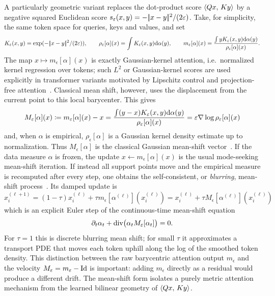 A particularly geometric variant replaces the dot-product score \(\langle Qx,\,Ky\rangle\) by a negative squared Euclidean score \(s_\varepsilon(x,y)=-|\!| x-y |\!|^2/(2\varepsilon)\). Take, for simplicity, the same token space for queries, keys and values, and set
\[
	K_\varepsilon(x,y)=\exp(-|\!| x-y |\!|^2/(2\varepsilon)),
	\qquad
	\rho_\varepsilon[\alpha](x)=\int K_\varepsilon(x,y)\mathrm{d}\alpha(y),
	\qquad
	m_\varepsilon[\alpha](x)
	=
	\frac{\int yK_\varepsilon(x,y)\mathrm{d}\alpha(y)}
	     {\rho_\varepsilon[\alpha](x)}.
\]
The map $x\mapsto m_\epsilon[\alpha](x)$ is exactly Gaussian-kernel attention, i.e.\ normalized kernel regression over tokens; such $L^2$ or Gaussian-kernel scores are used explicitly in transformer variants motivated by Lipschitz control and projection-free attention~\cite{KimPapamakariosMnih2020L2SelfAttention,KunduGhoshGhoshHonavar2026GaussianKernelAttention}. Classical mean shift, however, uses the displacement from the current point to this local barycenter. This gives
\begin{equation}\label{eq-l2-attention-mean-shift}
	M_\varepsilon[\alpha](x)
	\coloneqq
	m_\varepsilon[\alpha](x)-x
	=
	\frac{\int (y-x)K_\varepsilon(x,y)\mathrm{d}\alpha(y)}
	     {\rho_\varepsilon[\alpha](x)}
	=
	\varepsilon\nabla\log\rho_\varepsilon[\alpha](x)
\end{equation}
and, when $\alpha$ is empirical, $\rho_\epsilon[\alpha]$ is a Gaussian kernel density estimate up to normalization. Thus \(M_\epsilon[\alpha]\) is the classical Gaussian mean-shift vector~\cite{FukunagaHostetler1975,Cheng1995MeanShift,ComaniciuMeer2002MeanShift}. If the data measure $\alpha$ is frozen, the update $x\leftarrow m_\epsilon[\alpha](x)$ is the usual mode-seeking mean-shift iteration. If instead all support points move and the empirical measure is recomputed after every step, one obtains the self-consistent, or \emph{blurring}, mean-shift process~\cite{Chen2015BlurringMeanShift}. Its damped update is
\[
	x_i^{(\ell+1)}
	=
	(1-\tau)x_i^{(\ell)}+\tau m_\epsilon[\alpha^{(\ell)}](x_i^{(\ell)})
	=
	x_i^{(\ell)}+\tau M_\epsilon[\alpha^{(\ell)}](x_i^{(\ell)})
\]
which is an explicit Euler step of the continuous-time mean-shift equation
\[
	\partial_t\alpha_t+\operatorname{div}\bigl(\alpha_tM_\varepsilon[\alpha_t]\bigr)=0.
\]
For $\tau=1$ this is discrete blurring mean shift; for small $\tau$ it approximates a transport PDE that moves each token uphill along the log of the smoothed token density. This distinction between the raw barycentric attention output $m_\epsilon$ and the velocity $M_\varepsilon=m_\varepsilon-\mathrm{Id}$ is important: adding $m_\epsilon$ directly as a residual would produce a different drift. The mean-shift form isolates a purely metric attention mechanism from the learned bilinear geometry of $\langle Qx,\,Ky\rangle$.

